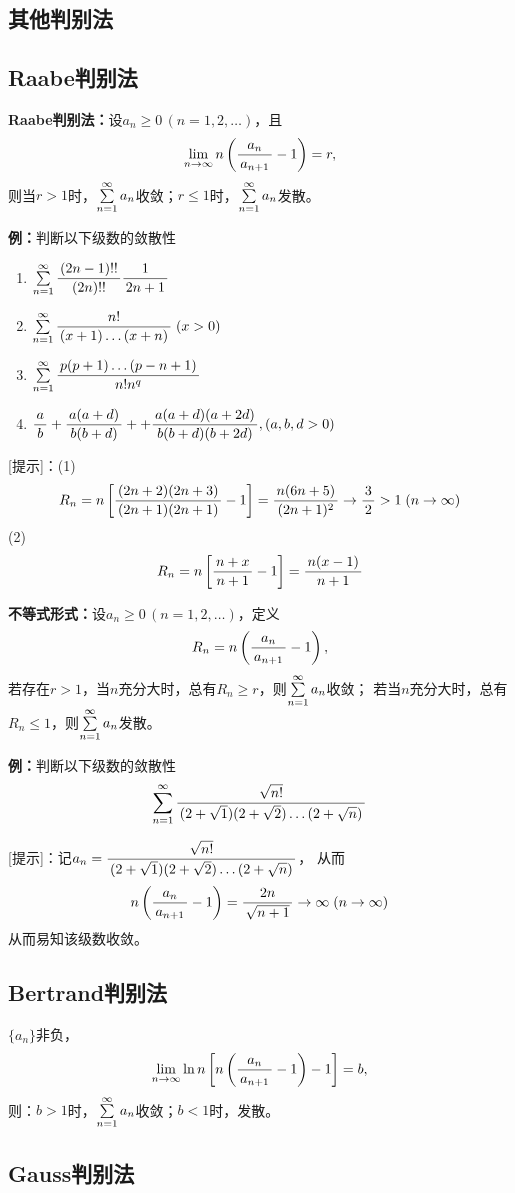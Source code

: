 \begin{shaded}

\subsection{其他判别法}

\subsection*{Raabe判别法}

{\bf Raabe判别法：}设$a_n\geq 0\,(n=1,2,\ldots)$，且
$$\limn n\left(\df{a_n}{a_{n+1}}-1\right)=r,$$
则当$r>1$时，$\sumn a_n$收敛；$r\leq 1$时，$\sumn a_n$发散。	

{\bf 例：}判断以下级数的敛散性
\begin{enumerate}[(1)]
  \setlength{\itemindent}{1cm}
  \item $\sumn\df{(2n-1)!!}{(2n)!!}\df 1{2n+1}$
  \item $\sumn\df{n!}{(x+1)\ldots(x+n)}\;(x>0)$
  \item $\sumn\df{p(p+1)\ldots(p-n+1)}{n!n^q}$
  \item $\df ab+\df{a(a+d)}{b(b+d)}++\df{a(a+d)(a+2d)}{b(b+d)(b+2d)},(a,b,d>0)$
\end{enumerate}

[提示]：(1)
$$R_n=n\left[\df{(2n+2)(2n+3)}{(2n+1)(2n+1)}-1\right]
=\df{n(6n+5)}{(2n+1)^2}\to\df32>1\;(n\to\infty)$$
(2)
$$R_n=n\left[\df{n+x}{n+1}-1\right]=\df{n(x-1)}{n+1}$$

{\bf 不等式形式：}设$a_n\geq 0\,(n=1,2,\ldots)$，定义
$$R_n=n\left(\df{a_n}{a_{n+1}}-1\right),$$
若存在$r>1$，当$n$充分大时，总有$R_n\geq r$，则$\sumn a_n$收敛；
若当$n$充分大时，总有$R_n\leq 1$，则$\sumn a_n$发散。

{\bf 例：}判断以下级数的敛散性
$$\sumn\df{\sqrt{n!}}{(2+\sqrt 1)(2+\sqrt 2)\ldots(2+\sqrt n)}$$

[提示]：记$a_n=\df{\sqrt{n!}}{(2+\sqrt 1)(2+\sqrt 2)\ldots(2+\sqrt n)}$，
从而
$$n\left(\df{a_n}{a_{n+1}}-1\right)=\df{2n}{\sqrt{n+1}}\to\infty\;(n\to\infty)$$
从而易知该级数收敛。

\subsection*{Bertrand判别法}

$\{a_n\}$非负，
$$\limn\ln n\left[n\left(\df{a_n}{a_{n+1}}-1\right)-1\right]=b,$$
则：$b>1$时，$\sumn a_n$收敛；$b<1$时，发散。


\subsection*{Gauss判别法}


\end{shaded}
